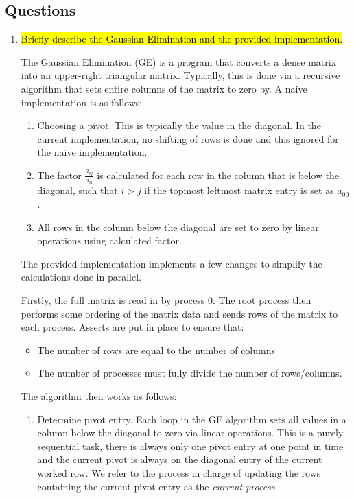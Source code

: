 \subsection{Questions}
\begin{enumerate}
	\item \hl{Briefly describe the Gaussian Elimination and the provided implementation.}

	The Gaussian Elimination (GE) is a program that converts a dense matrix into an upper-right triangular matrix. Typically, this is done via a recursive algorithm that sets entire columns of the matrix to zero by. A naive implementation is as follows:
\begin{enumerate}
	\item Choosing a pivot. This is typically the value in the diagonal. In the current implementation, no shifting of rows is done and this ignored for the naive implementation.
	\item The factor $\frac{a_{ij}}{a_{ii}}$ is calculated for each row in the column that is below the diagonal, such that $i > j$ if the topmost leftmost matrix entry is set as $a_{00}$.
	\item All rows in the column below the diagonal are set to zero by linear operations using calculated factor.
\end{enumerate}

The provided implementation implements a few changes to simplify the calculations done in parallel.

Firstly, the full matrix is read in by process 0. The root process then performs some ordering of the matrix data and sends rows of the matrix to each process. Asserts are put in place to ensure that:
\begin{itemize}
	\item The number of rows are equal to the number of columns
	\item The number of processes must fully divide the number of rows/columns.
\end{itemize}

The algorithm then works as follows:
\begin{enumerate}
\item Determine pivot entry. Each loop in the GE algorithm sets all values in a column below the diagonal to zero via linear operations. This is a purely sequential task, there is always only one pivot entry at one point in time and the current pivot is always on the diagonal entry of the current worked row. We refer to the process in charge of updating the rows containing the current pivot entry as the \textit{current process}. 


\end{enumerate}
\end{enumerate}
